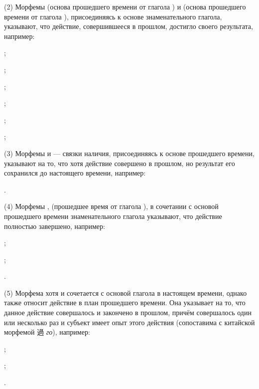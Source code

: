 (2)	Морфемы  (основа прошедшего времени от глагола ) и  (основа прошедшего времени от глагола ), присоединяясь к основе знаменательного глагола, указывают, что действие, совершившееся в прошлом, достигло своего результата, например:
\begin{prfsample}
	\item {};
	\item {};
	\item {};
	\item {};
	\item {};
	\item {};
\end{prfsample}

(3)	Морфемы	 и	 --- связки наличия, присоединяясь к основе прошедшего времени, указывают на то, что хотя действие совершено в прошлом, но результат его сохранился до настоящего времени, например:
\begin{prfsample}
	\item {}.
\end{prfsample}

(4)	Морфемы ,  (прошедшее время от глагола ),  в сочетании с основой прошедшего времени знаменательного глагола указывают, что действие полностью завершено, например:
\begin{prfsample}
	\item {};
	\item {};
	\item {}.
\end{prfsample}

(5)	Морфема  хотя и сочетается с основой глагола в настоящем времени, однако также относит действие в план прошедшего времени. Она указывает на то, что данное действие совершалось и закончено в прошлом, причём совершалось один или несколько раз и субъект имеет опыт этого
действия (сопоставима с китайской морфемой {\chinfont 過} \emph{го}), например:
\begin{prfsample}
	\item {};
	\item {};
	\item {}.
\end{prfsample}

